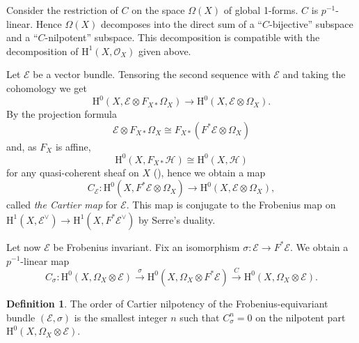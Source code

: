 \documentclass[12pt,a4]{amsart}
\theoremstyle{definition}
\newtheorem{defn}[claim]{Definition}
\begin{document}
Consider the restriction of $C$ on the space $\Omega(X)$ of global 1-forms.
$C$ is $p^{-1}$-linear. Hence $\Omega(X)$ decomposes into the direct sum of a 
``$C$-bijective'' subspace and a ``$C$-nilpotent'' subspace.
This decomposition is compatible with the decomposition of 
$\mathrm H^1(X,\mathcal O_X)$ given above. 


Let $\mathcal E$ be a vector bundle. 
Tensoring the second sequence with $\mathcal E$ and taking the cohomology
we get
$$\mathrm H^0(X,\mathcal E\otimes F_{X*} \Omega_X)\longrightarrow 
\mathrm H^0(X,\mathcal E\otimes  \Omega_X).$$
By the projection formula 
$$\mathcal E\otimes F_{X*}\Omega_X\cong F_{X*}(F^*\mathcal E\otimes \Omega_X) $$
and, as $F_X$ is affine,
$$\mathrm H^0(X,F_{X*}\mathcal H)\cong \mathrm H^0(X,\mathcal H) $$
for any quasi-coherent sheaf on $X$ (\cite[Ex.~8.1]{Har77}), hence we obtain a map
$$C_\mathcal{E}: \mathrm H^0(X,F^*\mathcal E\otimes \Omega_X)
\longrightarrow
\mathrm H^0(X,\mathcal E\otimes \Omega_X),$$
called \textit{the Cartier map} for $\mathcal E$. 
This map is conjugate to the Frobenius map on $\mathrm{H}^1(X,\mathcal E^\vee)\longrightarrow \mathrm{H}^1(X, F^*\mathcal{E}^\vee)$
by Serre's duality.


Let now $\mathcal E$ be Frobenius invariant. Fix an isomorphism
$\sigma: \mathcal E\longrightarrow F^*\mathcal E$.
We obtain a $p^{-1}$-linear map 
\begin{equation}\label{eq_Cartier_on_forms}
C_\sigma: \mathrm{H}^0(X,\Omega_X \otimes \mathcal E) \xrightarrow{\sigma} 
\mathrm{H}^0(X,\Omega_X \otimes F^* \mathcal E) \xrightarrow{C} 
\mathrm{H}^0(X,\Omega_X \otimes \mathcal E).\end{equation}
 

\begin{defn} \label{nilpotency} The order of Cartier nilpotency of the
Frobenius-equivariant bundle $(\mathcal E,\sigma)$ is the smallest integer $n$
such that $C_\sigma^n=0$ on the nilpotent
part $\mathrm{H}^0(X,\Omega_X\otimes \mathcal E)$. 
\end{defn}
\end{document}
